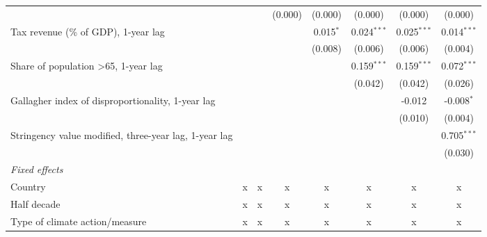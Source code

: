 \begin{tabular}{lccccccc}
                                                                     &               &               & (0.000)       & (0.000)       & (0.000)       & (0.000)       & (0.000)\\   
   Tax revenue (\% of GDP), 1-year lag                               &               &               &               & 0.015$^{*}$   & 0.024$^{***}$ & 0.025$^{***}$ & 0.014$^{***}$\\   
                                                                     &               &               &               & (0.008)       & (0.006)       & (0.006)       & (0.004)\\   
   Share of population >65, 1-year lag                               &               &               &               &               & 0.159$^{***}$ & 0.159$^{***}$ & 0.072$^{***}$\\   
                                                                     &               &               &               &               & (0.042)       & (0.042)       & (0.026)\\   
   Gallagher index of disproportionality, 1-year lag                 &               &               &               &               &               & -0.012        & -0.008$^{*}$\\   
                                                                     &               &               &               &               &               & (0.010)       & (0.004)\\   
   Stringency value modified, three-year lag, 1-year lag             &               &               &               &               &               &               & 0.705$^{***}$\\   
                                                                     &               &               &               &               &               &               & (0.030)\\   
   \emph{Fixed effects}\\
   Country                                                           & x             & x             & x             & x             & x             & x             & x\\  
   Half decade                                                       & x             & x             & x             & x             & x             & x             & x\\  
   Type of climate action/measure                                    & x             & x             & x             & x             & x             & x             & x\\  

\end{tabular}
